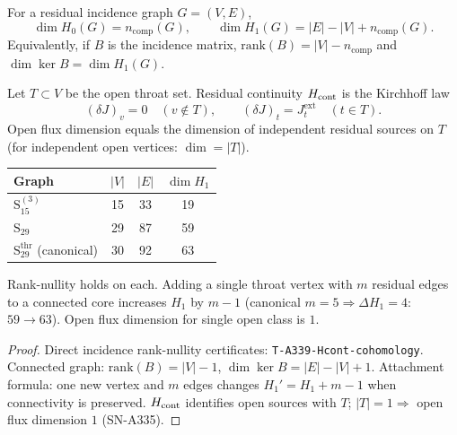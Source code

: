 \begin{definition}
\label{def:A339-abs}
For a residual incidence graph $G=(V,E)$,
\begin{equation}
\dim H_0(G)=n_{\mathrm{comp}}(G),
\qquad
\dim H_1(G)=|E|-|V|+n_{\mathrm{comp}}(G).
\end{equation}
Equivalently, if $B$ is the incidence matrix, $\mathrm{rank}(B)=|V|-n_{\mathrm{comp}}$ and $\dim\ker B=\dim H_1(G)$.
\end{definition}

\begin{definition}
\label{def:A339-Hcont}
Let $T\subset V$ be the open throat set. Residual continuity $H_{\rm cont}$ is the Kirchhoff law
\begin{equation}
(\delta J)_v=0\quad(v\notin T),
\qquad
(\delta J)_t=J^{\mathrm{ext}}_t\quad(t\in T).
\end{equation}
Open flux dimension equals the dimension of independent residual sources on $T$ (for independent open vertices: $\dim=|T|$).
\end{definition}

\begin{theorem}
\label{thm:A339}
\begin{center}
\begin{tabular}{@{}lccc@{}}
\toprule
Graph & $|V|$ & $|E|$ & $\dim H_1$ \\
\midrule
$\mathrm{S}_{15}^{(3)}$ & 15 & 33 & 19 \\
$\mathrm{S}_{29}$ & 29 & 87 & 59 \\
$\mathrm{S}_{29}^{\mathrm{thr}}$ (canonical) & 30 & 92 & 63 \\
\bottomrule
\end{tabular}
\end{center}
Rank-nullity holds on each. Adding a single throat vertex with $m$ residual edges to a connected core increases $H_1$ by $m-1$ (canonical $m=5\Rightarrow \Delta H_1=4$: $59\to 63$). Open flux dimension for single open class is $1$.
\end{theorem}

\begin{proof}
Direct incidence rank-nullity certificates: \texttt{T-A339-Hcont-cohomology}.
Connected graph: $\mathrm{rank}(B)=|V|-1$, $\dim\ker B=|E|-|V|+1$.
Attachment formula: one new vertex and $m$ edges changes
$H_1'=H_1+m-1$ when connectivity is preserved.
$H_{\rm cont}$ identifies open sources with $T$; $|T|=1\Rightarrow$ open flux dimension $1$ (SN-A335).
\end{proof}

